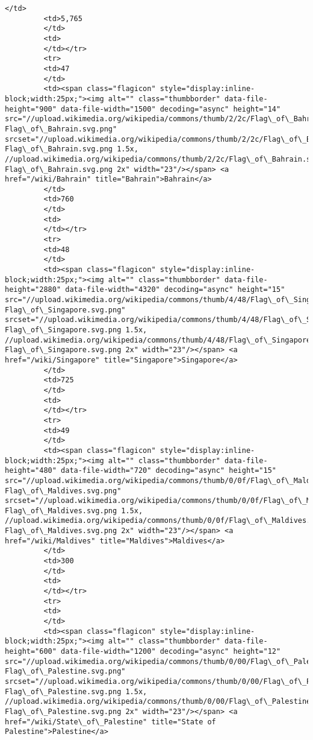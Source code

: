 \documentclass[11pt]{article}
\begin{document}
\begin{Verbatim}[commandchars=\\\{\}]
         </td>
         <td>5,765
         </td>
         <td>
         </td></tr>
         <tr>
         <td>47
         </td>
         <td><span class="flagicon" style="display:inline-block;width:25px;"><img alt="" class="thumbborder" data-file-height="900" data-file-width="1500" decoding="async" height="14" src="//upload.wikimedia.org/wikipedia/commons/thumb/2/2c/Flag\_of\_Bahrain.svg/23px-Flag\_of\_Bahrain.svg.png" srcset="//upload.wikimedia.org/wikipedia/commons/thumb/2/2c/Flag\_of\_Bahrain.svg/35px-Flag\_of\_Bahrain.svg.png 1.5x, //upload.wikimedia.org/wikipedia/commons/thumb/2/2c/Flag\_of\_Bahrain.svg/46px-Flag\_of\_Bahrain.svg.png 2x" width="23"/></span> <a href="/wiki/Bahrain" title="Bahrain">Bahrain</a>
         </td>
         <td>760
         </td>
         <td>
         </td></tr>
         <tr>
         <td>48
         </td>
         <td><span class="flagicon" style="display:inline-block;width:25px;"><img alt="" class="thumbborder" data-file-height="2880" data-file-width="4320" decoding="async" height="15" src="//upload.wikimedia.org/wikipedia/commons/thumb/4/48/Flag\_of\_Singapore.svg/23px-Flag\_of\_Singapore.svg.png" srcset="//upload.wikimedia.org/wikipedia/commons/thumb/4/48/Flag\_of\_Singapore.svg/35px-Flag\_of\_Singapore.svg.png 1.5x, //upload.wikimedia.org/wikipedia/commons/thumb/4/48/Flag\_of\_Singapore.svg/45px-Flag\_of\_Singapore.svg.png 2x" width="23"/></span> <a href="/wiki/Singapore" title="Singapore">Singapore</a>
         </td>
         <td>725
         </td>
         <td>
         </td></tr>
         <tr>
         <td>49
         </td>
         <td><span class="flagicon" style="display:inline-block;width:25px;"><img alt="" class="thumbborder" data-file-height="480" data-file-width="720" decoding="async" height="15" src="//upload.wikimedia.org/wikipedia/commons/thumb/0/0f/Flag\_of\_Maldives.svg/23px-Flag\_of\_Maldives.svg.png" srcset="//upload.wikimedia.org/wikipedia/commons/thumb/0/0f/Flag\_of\_Maldives.svg/35px-Flag\_of\_Maldives.svg.png 1.5x, //upload.wikimedia.org/wikipedia/commons/thumb/0/0f/Flag\_of\_Maldives.svg/45px-Flag\_of\_Maldives.svg.png 2x" width="23"/></span> <a href="/wiki/Maldives" title="Maldives">Maldives</a>
         </td>
         <td>300
         </td>
         <td>
         </td></tr>
         <tr>
         <td>
         </td>
         <td><span class="flagicon" style="display:inline-block;width:25px;"><img alt="" class="thumbborder" data-file-height="600" data-file-width="1200" decoding="async" height="12" src="//upload.wikimedia.org/wikipedia/commons/thumb/0/00/Flag\_of\_Palestine.svg/23px-Flag\_of\_Palestine.svg.png" srcset="//upload.wikimedia.org/wikipedia/commons/thumb/0/00/Flag\_of\_Palestine.svg/35px-Flag\_of\_Palestine.svg.png 1.5x, //upload.wikimedia.org/wikipedia/commons/thumb/0/00/Flag\_of\_Palestine.svg/46px-Flag\_of\_Palestine.svg.png 2x" width="23"/></span> <a href="/wiki/State\_of\_Palestine" title="State of Palestine">Palestine</a>

\end{Verbatim}
\end{document}
